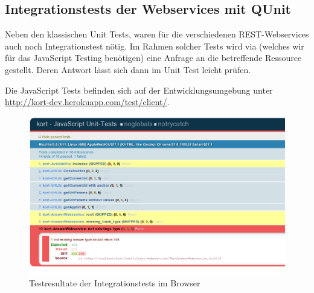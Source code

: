 \cleardoublepage
\subsection{Integrationstests der Webservices mit QUnit}
Neben den klassischen Unit Tests, waren für die verschiedenen \gls{REST}-Webservices auch noch Integrationstest nötig.
Im Rahmen solcher Tests wird via  (welches wir für das JavaScript Testing benötigen) eine Anfrage an die betreffende Ressource gestellt.
Deren Antwort lässt sich dann im Unit Test leicht prüfen.

Die JavaScript Tests befinden sich auf der Entwicklungsumgebung unter \url{http://kort-dev.herokuapp.com/test/client/}.

\begin{figure}[H]
	\centering
	\includegraphics[width=\textwidth]{images/implementation/backend/qunit-skipped-test}
	\caption{Testresultate der Integrationstests im Browser}
	\label{image-qunit-skipped-test}
\end{figure}